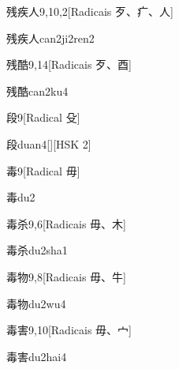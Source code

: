 \begin{entry}{残疾人}{9,10,2}[Radicais ⽍、⽧、⼈]
  \begin{phonetics}{残疾人}{can2ji2ren2}
  \end{phonetics}
\end{entry}

\begin{entry}{残酷}{9,14}[Radicais ⽍、⾣]
  \begin{phonetics}{残酷}{can2ku4}
  \end{phonetics}
\end{entry}

\begin{entry}{段}{9}[Radical ⽎]
  \begin{phonetics}{段}{duan4}[][HSK 2]
  \end{phonetics}
\end{entry}

\begin{entry}{毒}{9}[Radical ⽏]
  \begin{phonetics}{毒}{du2}
  \end{phonetics}
\end{entry}

\begin{entry}{毒杀}{9,6}[Radicais ⽏、⽊]
  \begin{phonetics}{毒杀}{du2sha1}
  \end{phonetics}
\end{entry}

\begin{entry}{毒物}{9,8}[Radicais ⽏、⽜]
  \begin{phonetics}{毒物}{du2wu4}
  \end{phonetics}
\end{entry}

\begin{entry}{毒害}{9,10}[Radicais ⽏、⼧]
  \begin{phonetics}{毒害}{du2hai4}
  \end{phonetics}
\end{entry}


